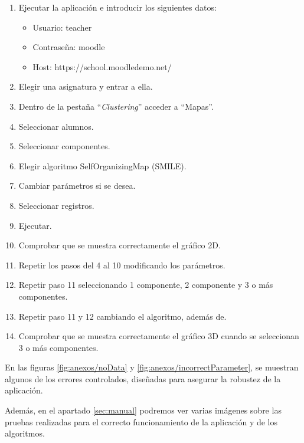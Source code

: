 \begin{enumerate}
    \item Ejecutar la aplicación e introducir los siguientes datos:
    \begin{itemize}
        \item Usuario: teacher
        \item Contraseña: moodle
        \item Host: https://school.moodledemo.net/
    \end{itemize}
    \item Elegir una asignatura y entrar a ella.
    \item Dentro de la pestaña ``\emph{Clustering}'' acceder a ``Mapas''.
    \item Seleccionar alumnos.
    \item Seleccionar componentes.
    \item Elegir algoritmo SelfOrganizingMap (SMILE).
    \item Cambiar parámetros si se desea.
    \item Seleccionar registros.
    \item Ejecutar.
    \item Comprobar que se muestra correctamente el gráfico 2D.
    \item Repetir los pasos del 4 al 10 modificando los parámetros.
    \item Repetir paso 11 seleccionando 1 componente, 2 componente y 3 o más componentes.
    \item Repetir paso 11 y 12 cambiando el algoritmo, además de.
    \item Comprobar que se muestra correctamente el gráfico 3D cuando se seleccionan 3 o más componentes.
\end{enumerate}

En las figuras \ref{fig:anexos/noData} y \ref{fig:anexos/incorrectParameter}, se muestran algunos de los errores controlados, diseñadas para asegurar la robustez de la aplicación.


Además, en el apartado \ref{sec:manual} podremos ver varias imágenes sobre las pruebas realizadas para el correcto funcionamiento de la aplicación y de los algoritmos. 